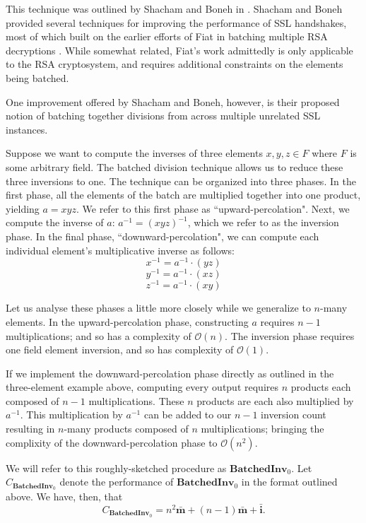 This technique was outlined by Shacham and Boneh in \cite{batching}. Shacham and Boneh provided several techniques for improving the performance of SSL handshakes, most of which built on the earlier efforts of Fiat in batching multiple RSA decryptions \cite{RSAbatch}. While somewhat related, Fiat's work admittedly is only applicable to the RSA cryptosystem, and requires additional constraints on the elements being batched. 

One improvement offered by Shacham and Boneh, however, is their proposed notion of batching together divisions from across multiple unrelated SSL instances. 

Suppose we want to compute the inverses of three elements $x, y, z \in F$ where $F$ is some arbitrary field. The batched division technique allows us to reduce these three inversions to one. The technique can be organized into three phases. In the first phase, all the elements of the batch are multiplied together into one product, yielding $a = xyz$. We refer to this first phase as ``upward-percolation". Next, we compute the inverse of $a$: $a^{-1} = (xyz)^{-1}$, which we refer to as the inversion phase. In the final phase, ``downward-percolation", we can compute each individual element's multiplicative inverse as follows:
$$
x^{-1} = a^{-1} \cdot (yz)
$$
$$
y^{-1} = a^{-1} \cdot (xz)
$$
$$
z^{-1} = a^{-1} \cdot (xy)
$$

Let us analyse these phases a little more closely while we generalize to $n$-many elements. In the upward-percolation phase, constructing $a$ requires $n-1$ multiplications; and so has a complexity of $\mathcal{O}(n)$. The inversion phase requires one field element inversion, and so has complexity of $\mathcal{O}(1)$. 

If we implement the downward-percolation phase directly as outlined in the three-element example above, computing every output requires $n$ products each composed of $n-1$ multiplications. These $n$ products are each also multiplied by $a^{-1}$. This multiplication by $a^{-1}$ can be added to our $n-1$ inversion count resulting in $n$-many products composed of $n$ multiplications; bringing the complixity of the downward-percolation phase to $\mathcal{O}(n^2)$.

We will refer to this roughly-sketched procedure as $\textbf{BatchedInv}_0$. Let $C_{\textbf{BatchedInv}_0}$ denote the performance of $\textbf{BatchedInv}_0$ in the format outlined above. We have, then, that 
$$
C_{\textbf{BatchedInv}_0} = n^2\bar{\textbf{m}} + (n-1)\bar{\textbf{m}} + \bar{\textbf{i}}.
$$

